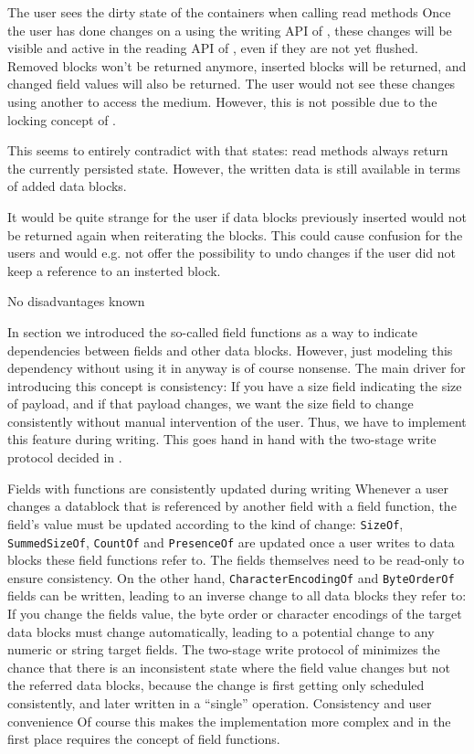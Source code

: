 {%
The user sees the dirty state of the containers when calling read methods
}
{%
Once the user has done changes on a \IMediumStore{} using the writing API of \COMPdataPartManagement{}, these changes will be visible and active in the reading API of \COMPdataPartManagement{}, even if they are not yet flushed. Removed blocks won't be returned anymore, inserted blocks will be returned, and changed field values will also be returned. The user would not see these changes using another \IMediumStore{} to access the medium. However, this is not possible due to the locking concept of \COMPmedia{}.
}
{%
  This seems to entirely contradict with  that states: \COMPmedia{} read methods always return the currently persisted state. However, the written data is still available in terms of added data blocks.
  
It would be quite strange for the user if data blocks previously inserted would not be returned again when reiterating the blocks. This could cause confusion for the users and would e.g. not offer the possibility to undo changes if the user did not keep a reference to an insterted block.
}
{%
No disadvantages known
}

In section  we introduced the so-called field functions as a way to indicate dependencies between fields and other data blocks. However, just modeling this dependency without using it in anyway is of course nonsense. The main driver for introducing this concept is consistency: If you have a size field indicating the size of payload, and if that payload changes, we want the size field to change consistently without manual intervention of the user. Thus, we have to implement this feature during writing. This goes hand in hand with the two-stage write protocol decided in .

{%
Fields with functions are consistently updated during writing 
}
{%
Whenever a user changes a datablock that is referenced by another field with a field function, the field's value must be updated according to the kind of change: \texttt{SizeOf}, \texttt{SummedSizeOf}, \texttt{CountOf} and \texttt{PresenceOf} are updated once a user writes to data blocks these field functions refer to. The fields themselves need to be read-only to ensure consistency. On the other hand, \texttt{CharacterEncodingOf} and \texttt{ByteOrderOf} fields can be written, leading to an inverse change to all data blocks they refer to: If you change the fields value, the byte order or character encodings of the target data blocks must change automatically, leading to a potential change to any numeric or string target fields. The two-stage write protocol of  minimizes the chance that there is an inconsistent state where the field value changes but not the referred data blocks, because the change is first getting only scheduled consistently, and later written in a ``single'' operation. 
}
{%
Consistency and user convenience
}
{%
Of course this makes the implementation more complex and in the first place requires the concept of field functions.
}

